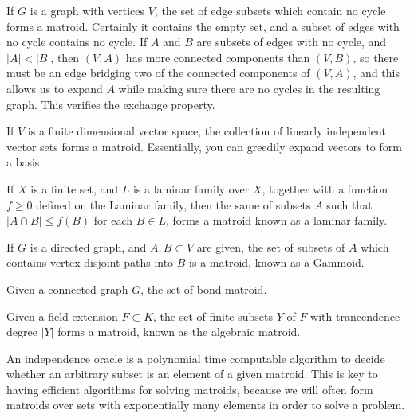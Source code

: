 \begin{example}
    If $G$ is a graph with vertices $V$, the set of edge subsets which contain no cycle forms a matroid. Certainly it contains the empty set, and a subset of edges with no cycle contains no cycle. If $A$ and $B$ are subsets of edges with no cycle, and $|A| < |B|$, then $(V,A)$ has more connected components than $(V,B)$, so there must be an edge bridging two of the connected components of $(V,A)$, and this allows us to expand $A$ while making sure there are no cycles in the resulting graph. This verifies the exchange property.
\end{example}

\begin{example}
    If $V$ is a finite dimensional vector space, the collection of linearly independent vector sets forms a matroid. Essentially, you can greedily expand vectors to form a basis.
\end{example}

\begin{example}
    If $X$ is a finite set, and $L$ is a laminar family over $X$, together with a function $f \geq 0$ defined on the Laminar family, then the same of subsets $A$ such that $|A \cap B| \leq f(B)$ for each $B \in L$, forms a matroid known as a laminar family.
\end{example}

\begin{example}
    If $G$ is a directed graph, and $A, B \subset V$ are given, the set of subsets of $A$ which contains vertex disjoint paths into $B$ is a matroid, known as a Gammoid.
\end{example}

\begin{example}
    Given a connected graph $G$, the set of bond matroid.
\end{example}

\begin{example}
    Given a field extension $F \subset K$, the set of finite subsets $Y$ of $F$ with trancendence degree $|Y|$ forms a matroid, known as the algebraic matroid.
\end{example}

An independence oracle is a polynomial time computable algorithm to decide whether an arbitrary subset is an element of a given matroid. This is key to having efficient algorithms for solving matroids, because we will often form matroids over sets with exponentially many elements in order to solve a problem.

